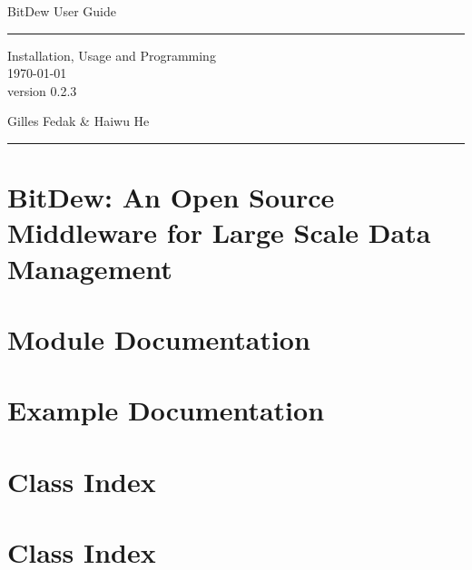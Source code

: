 \documentclass[a4paper]{book}
\begin{document}
\hypersetup{pageanchor=false}
\begin{titlepage}
\vspace*{2cm}
\null\vfil
\begin{flushleft}
  \huge BitDew User Guide
\end{flushleft}
\par
\hrule height 4pt
\par
\begin{flushright}
  \LARGE Installation, Usage and Programming \\
\large \today\\
 version 0.2.3 \\
\par
\end{flushright}
\vfil\null
\vspace*{8cm}
\begin{flushleft}
\huge Gilles Fedak \& Haiwu He
\end{flushleft}
\par
\hrule height 4pt
\par
\normalsize
\end{titlepage}
\clearemptydoublepage
{}
\tableofcontents
\clearemptydoublepage
{}
\hypersetup{pageanchor=true}
\chapter{BitDew: An Open Source Middleware for Large Scale Data Management}
\label{index}\hypertarget{index}{}
\chapter{Module Documentation}



\chapter{Example Documentation}




\chapter{Class Index}


\chapter{Class Index}

\end{document}
